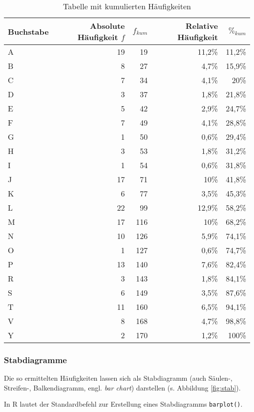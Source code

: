\documentclass[
  ngerman,
]{article}
\begin{document}
\begin{table}

\caption{\label{tab:haeufkum}Tabelle mit kumulierten Häufigkeiten}
\centering
\begin{tabular}[t]{lrrrr}
\toprule
Buchstabe & Absolute Häufigkeit $f$ & $f_{kum}$ & Relative Häufigkeit & $\%_{kum}$\\
\midrule
A & 19 & 19 & 11,2\% & 11,2\%\\
B & 8 & 27 & 4,7\% & 15,9\%\\
C & 7 & 34 & 4,1\% & 20\%\\
D & 3 & 37 & 1,8\% & 21,8\%\\
E & 5 & 42 & 2,9\% & 24,7\%\\
F & 7 & 49 & 4,1\% & 28,8\%\\
G & 1 & 50 & 0,6\% & 29,4\%\\
H & 3 & 53 & 1,8\% & 31,2\%\\
I & 1 & 54 & 0,6\% & 31,8\%\\
J & 17 & 71 & 10\% & 41,8\%\\
K & 6 & 77 & 3,5\% & 45,3\%\\
L & 22 & 99 & 12,9\% & 58,2\%\\
M & 17 & 116 & 10\% & 68,2\%\\
N & 10 & 126 & 5,9\% & 74,1\%\\
O & 1 & 127 & 0,6\% & 74,7\%\\
P & 13 & 140 & 7,6\% & 82,4\%\\
R & 3 & 143 & 1,8\% & 84,1\%\\
S & 6 & 149 & 3,5\% & 87,6\%\\
T & 11 & 160 & 6,5\% & 94,1\%\\
V & 8 & 168 & 4,7\% & 98,8\%\\
Y & 2 & 170 & 1,2\% & 100\%\\
\bottomrule
\end{tabular}
\end{table}

\hypertarget{stabdiagramme}{%
\subsubsection{Stabdiagramme}\label{stabdiagramme}}

Die so ermittelten Häufigkeiten lassen sich als Stabdiagramm (auch Säulen-, Streifen-, Balkendiagramm, engl. \emph{bar chart}) darstellen (s. Abbildung \ref{fig:stab}).

\begin{rtip}
In R lautet der Standardbefehl zur Erstellung eines Stabdiagramms {\tt barplot()}.
\end{rtip}
\end{document}
